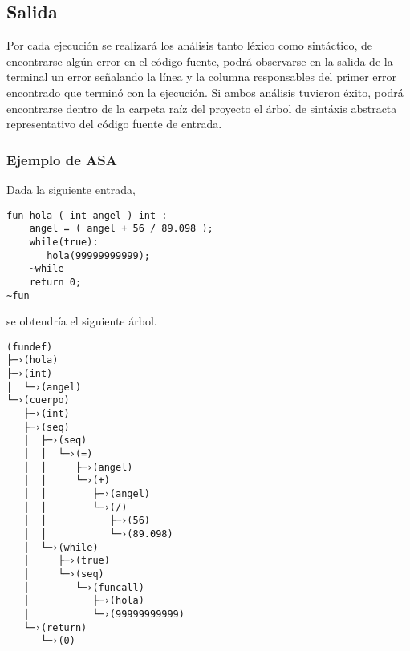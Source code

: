 \documentclass[12pt]{article}
\begin{document}
\subsection{Salida}
Por cada ejecución se realizará los análisis tanto léxico como sintáctico, de encontrarse algún error en el código fuente, podrá observarse en la salida de la terminal un error señalando la línea y la columna responsables del primer error encontrado que terminó con la ejecución. Si ambos análisis tuvieron éxito, podrá encontrarse dentro de la carpeta raíz del proyecto el árbol de sintáxis abstracta representativo del código fuente de entrada.

\subsubsection*{Ejemplo de ASA}
Dada la siguiente entrada,

\begin{verbatim}
fun hola ( int angel ) int : 
    angel = ( angel + 56 / 89.098 );
    while(true):
       hola(99999999999);
    ~while
    return 0;
~fun
\end{verbatim}
se obtendría el siguiente árbol.
\begin{verbatim}
(fundef)
├─›(hola)
├─›(int)
│  └─›(angel)
└─›(cuerpo)
   ├─›(int)
   ├─›(seq)
   │  ├─›(seq)
   │  │  └─›(=)
   │  │     ├─›(angel)
   │  │     └─›(+)
   │  │        ├─›(angel)
   │  │        └─›(/)
   │  │           ├─›(56)
   │  │           └─›(89.098)
   │  └─›(while)
   │     ├─›(true)
   │     └─›(seq)
   │        └─›(funcall)
   │           ├─›(hola)
   │           └─›(99999999999)
   └─›(return)
      └─›(0)

\end{verbatim}
\end{document}
